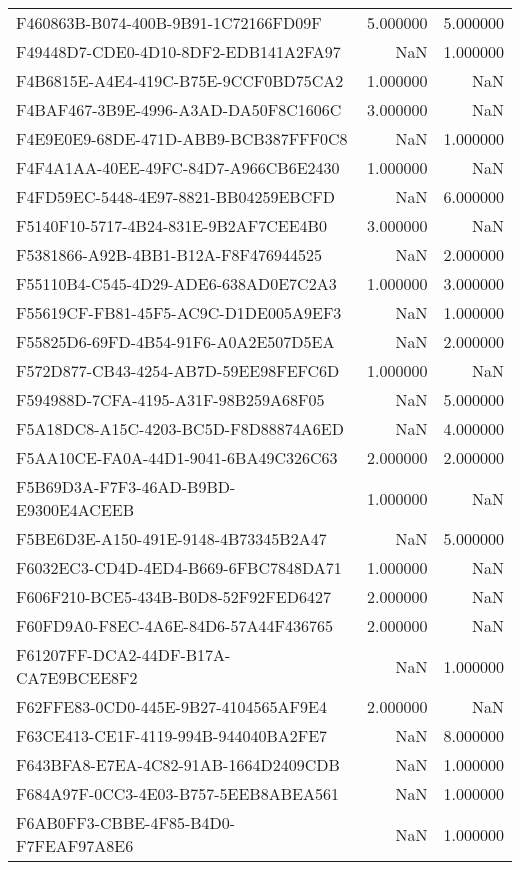 \begin{tabular}{lrr}
F460863B-B074-400B-9B91-1C72166FD09F & 5.000000 & 5.000000 \\
F49448D7-CDE0-4D10-8DF2-EDB141A2FA97 & NaN & 1.000000 \\
F4B6815E-A4E4-419C-B75E-9CCF0BD75CA2 & 1.000000 & NaN \\
F4BAF467-3B9E-4996-A3AD-DA50F8C1606C & 3.000000 & NaN \\
F4E9E0E9-68DE-471D-ABB9-BCB387FFF0C8 & NaN & 1.000000 \\
F4F4A1AA-40EE-49FC-84D7-A966CB6E2430 & 1.000000 & NaN \\
F4FD59EC-5448-4E97-8821-BB04259EBCFD & NaN & 6.000000 \\
F5140F10-5717-4B24-831E-9B2AF7CEE4B0 & 3.000000 & NaN \\
F5381866-A92B-4BB1-B12A-F8F476944525 & NaN & 2.000000 \\
F55110B4-C545-4D29-ADE6-638AD0E7C2A3 & 1.000000 & 3.000000 \\
F55619CF-FB81-45F5-AC9C-D1DE005A9EF3 & NaN & 1.000000 \\
F55825D6-69FD-4B54-91F6-A0A2E507D5EA & NaN & 2.000000 \\
F572D877-CB43-4254-AB7D-59EE98FEFC6D & 1.000000 & NaN \\
F594988D-7CFA-4195-A31F-98B259A68F05 & NaN & 5.000000 \\
F5A18DC8-A15C-4203-BC5D-F8D88874A6ED & NaN & 4.000000 \\
F5AA10CE-FA0A-44D1-9041-6BA49C326C63 & 2.000000 & 2.000000 \\
F5B69D3A-F7F3-46AD-B9BD-E9300E4ACEEB & 1.000000 & NaN \\
F5BE6D3E-A150-491E-9148-4B73345B2A47 & NaN & 5.000000 \\
F6032EC3-CD4D-4ED4-B669-6FBC7848DA71 & 1.000000 & NaN \\
F606F210-BCE5-434B-B0D8-52F92FED6427 & 2.000000 & NaN \\
F60FD9A0-F8EC-4A6E-84D6-57A44F436765 & 2.000000 & NaN \\
F61207FF-DCA2-44DF-B17A-CA7E9BCEE8F2 & NaN & 1.000000 \\
F62FFE83-0CD0-445E-9B27-4104565AF9E4 & 2.000000 & NaN \\
F63CE413-CE1F-4119-994B-944040BA2FE7 & NaN & 8.000000 \\
F643BFA8-E7EA-4C82-91AB-1664D2409CDB & NaN & 1.000000 \\
F684A97F-0CC3-4E03-B757-5EEB8ABEA561 & NaN & 1.000000 \\
F6AB0FF3-CBBE-4F85-B4D0-F7FEAF97A8E6 & NaN & 1.000000 \\

\end{tabular}
